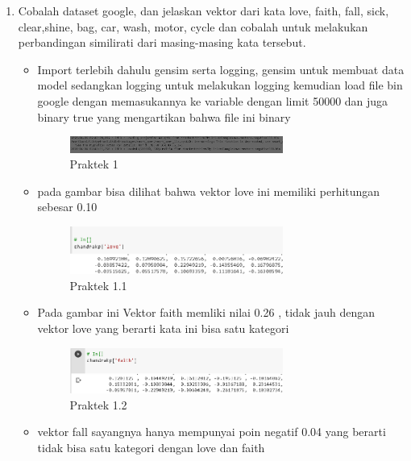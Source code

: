 \begin{enumerate}
	\item Cobalah dataset google, dan jelaskan vektor dari kata love, faith, fall, sick, clear,shine, bag, car, wash, motor, cycle dan cobalah untuk melakukan perbandingan similirati dari masing-masing kata tersebut.
	\begin{itemize}
		\item Import terlebih dahulu gensim serta logging, gensim untuk membuat data model sedangkan logging untuk melakukan logging kemudian load file bin google dengan memasukannya ke variable dengan limit 50000 dan juga binary true yang mengartikan bahwa file ini binary
		\hfill\break
		
		\begin{figure}[H]
			\includegraphics[width=7cm]{figures/1174079/5/7.png}
			\centering
			\caption{Praktek 1}
		\end{figure}
		\item pada gambar bisa dilihat bahwa vektor love ini memiliki perhitungan sebesar 0.10
		\hfill\break
		
		\begin{figure}[H]
			\includegraphics[width=7cm]{figures/1174079/5/8.png}
			\centering
			\caption{Praktek 1.1}
		\end{figure}
		\item Pada gambar ini Vektor faith memliki nilai 0.26 , tidak jauh dengan vektor love yang berarti kata ini bisa satu kategori
		\hfill\break
		
		\begin{figure}[H]
			\includegraphics[width=7cm]{figures/1174079/5/9.png}
			\centering
			\caption{Praktek 1.2}
		\end{figure}
		\item vektor fall sayangnya hanya mempunyai poin negatif 0.04 yang berarti tidak bisa satu kategori dengan love dan faith
		\hfill\break
		

\end{itemize}
\end{enumerate}
